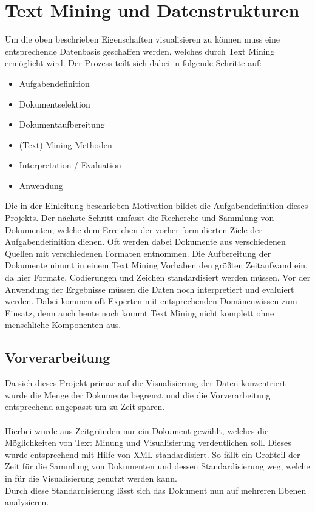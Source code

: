 \section{Text Mining und Datenstrukturen}
Um die oben beschrieben Eigenschaften visualisieren zu können muss eine entsprechende Datenbasis geschaffen werden, welches durch Text Mining ermöglicht wird. Der Prozess teilt sich dabei in folgende Schritte auf:
\begin{itemize}
\item Aufgabendefinition
\item Dokumentselektion
\item Dokumentaufbereitung
\item (Text) Mining Methoden
\item Interpretation / Evaluation
\item Anwendung
\end{itemize}
Die in der Einleitung beschrieben Motivation bildet die Aufgabendefinition dieses Projekts. Der nächste Schritt umfasst die Recherche und Sammlung von Dokumenten, welche dem Erreichen der vorher formulierten Ziele der Aufgabendefinition dienen. Oft werden dabei Dokumente aus verschiedenen Quellen mit verschiedenen Formaten entnommen.  Die Aufbereitung der Dokumente nimmt in einem Text Mining Vorhaben den größten Zeitaufwand ein, da hier Formate, Codierungen und Zeichen standardisiert werden müssen. Vor der Anwendung der Ergebnisse müssen die Daten noch interpretiert und evaluiert werden. Dabei kommen oft Experten mit entsprechenden Domänenwissen zum Einsatz, denn auch heute noch kommt Text Mining nicht komplett ohne menschliche Komponenten aus.

\subsection{Vorverarbeitung}
Da sich dieses Projekt primär auf die Visualisierung der Daten konzentriert wurde die Menge der Dokumente begrenzt und die die Vorverarbeitung entsprechend angepasst um zu Zeit sparen. \\
\\
Hierbei wurde aus Zeitgründen nur ein Dokument gewählt, welches die Möglichkeiten von Text Minung und Visualisierung verdeutlichen soll. Dieses wurde entsprechend mit Hilfe von XML standardisiert. So fällt ein Großteil der Zeit für die Sammlung von Dokumenten und dessen Standardisierung weg, welche in für die Visualisierung genutzt werden kann. \\
Durch diese Standardisierung lässt sich das Dokument nun auf mehreren Ebenen analysieren.

